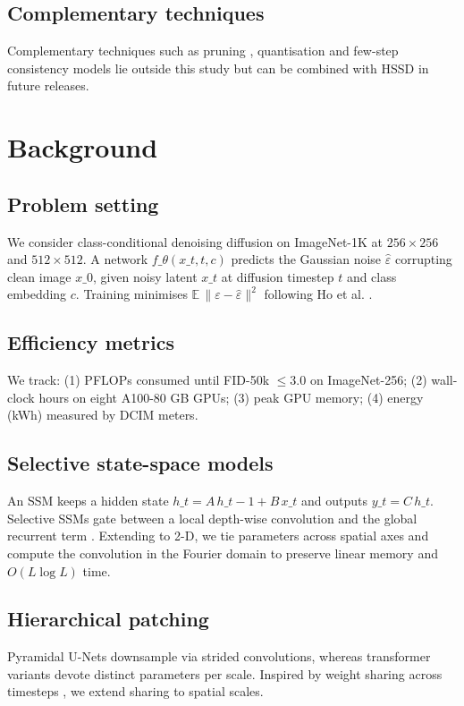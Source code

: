 \documentclass{article}
\begin{document}
\subsection{Complementary techniques}
Complementary techniques such as pruning \cite{fang-2023-structural}, quantisation \cite{so-2023-temporal} and few-step consistency models \cite{heek-2024-multistep} lie outside this study but can be combined with HSSD in future releases.

\section{Background}
\subsection{Problem setting}
We consider class-conditional denoising diffusion on ImageNet-1K at $256 \times 256$ and $512 \times 512$. A network $f\_{\theta}(x\_t, t, c)$ predicts the Gaussian noise $\hat{\varepsilon}$ corrupting clean image $x\_0$, given noisy latent $x\_t$ at diffusion timestep $t$ and class embedding $c$. Training minimises $\mathbb{E}\,\|\varepsilon - \hat{\varepsilon}\|^2$ following Ho et al. \cite{ho-2020-denoising}.

\subsection{Efficiency metrics}
We track: (1) PFLOPs consumed until FID-50k $\leq 3.0$ on ImageNet-256; (2) wall-clock hours on eight A100-80 GB GPUs; (3) peak GPU memory; (4) energy (kWh) measured by DCIM meters.

\subsection{Selective state-space models}
An SSM keeps a hidden state $h\_t = A\,h\_{t-1}+B\,x\_t$ and outputs $y\_t = C\,h\_t$. Selective SSMs gate between a local depth-wise convolution and the global recurrent term \cite{yan-2023-diffusion}. Extending to 2-D, we tie parameters across spatial axes and compute the convolution in the Fourier domain to preserve linear memory and $O(L\log L)$ time.

\subsection{Hierarchical patching}
Pyramidal U-Nets downsample via strided convolutions, whereas transformer variants devote distinct parameters per scale. Inspired by weight sharing across timesteps \cite{author-year-leveraging}, we extend sharing to spatial scales.
\end{document}

